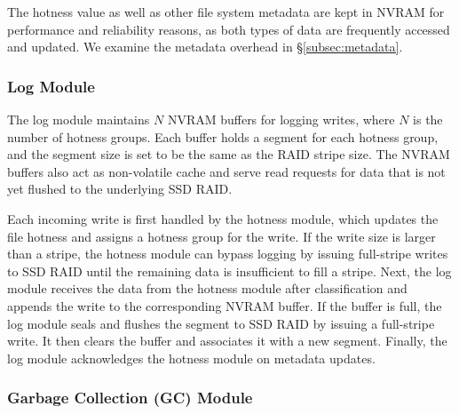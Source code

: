 The hotness value as well as other file system metadata are kept in NVRAM for
performance and reliability reasons, as both types of data are frequently
accessed and updated.  We examine the metadata overhead in
\S\ref{subsec:metadata}.

\subsubsection{Log Module} 

The log module maintains $N$ NVRAM buffers for logging writes, where $N$ is
the number of hotness groups.  Each buffer holds a segment for each hotness
group, and the segment size is set to be the same as the RAID stripe size.
The NVRAM buffers also act as non-volatile cache and serve read requests for
data that is not yet flushed to the underlying SSD RAID.


Each incoming write is first handled by the hotness module, which updates the
file hotness and assigns a hotness group for the write. If the write size is
larger than a stripe, the hotness module can bypass logging by issuing
full-stripe writes to SSD RAID until the remaining data is insufficient to fill 
a stripe. Next, the log module receives the data from the hotness module after
classification and appends the write to the corresponding NVRAM buffer.  If
the buffer is full, the log module seals and flushes the segment to SSD RAID
by issuing a full-stripe write.  It then clears the buffer and associates it
with a new segment. Finally, the log module acknowledges the hotness module
on metadata updates.

\subsubsection{Garbage Collection (GC) Module}
\label{subsubsec:gcmod}



